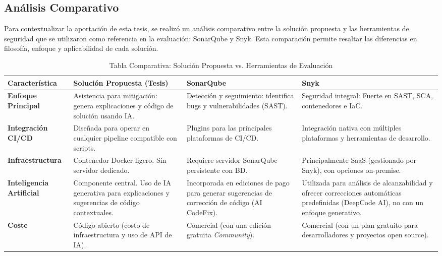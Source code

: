 \subsection{Análisis Comparativo}

Para contextualizar la aportación de esta tesis, se realizó un análisis comparativo entre la solución propuesta y las herramientas de seguridad que se utilizaron como referencia en la evaluación: SonarQube y Snyk. Esta comparación permite resaltar las diferencias en filosofía, enfoque y aplicabilidad de cada solución.

\begin{table}[h!]
\centering
\caption{Tabla Comparativa: Solución Propuesta vs. Herramientas de Evaluación}
\label{tab:comparativa_sistemas}
\begin{tabular}{|p{2.6cm}|p{3.9cm}|p{3.9cm}|p{3.9cm}|}
\hline
\textbf{Característica} & 
\textbf{Solución Propuesta (Tesis)} & 
\textbf{SonarQube} \cite{sonarqube_editions} & 
\textbf{Snyk} \cite{snyk_plans} \\ \hline

\textbf{Enfoque Principal} & 
Asistencia para mitigación: genera explicaciones y código de solución usando IA. & 
Detección y seguimiento: identifica bugs y vulnerabilidades (SAST). & 
Seguridad integral: Fuerte en SAST, SCA, contenedores e IaC. \\ \hline

\textbf{Integración CI/CD} & 
Diseñada para operar en cualquier pipeline compatible con scripts. & 
Plugins para las principales plataformas de CI/CD. & 
Integración nativa con múltiples plataformas y herramientas de desarrollo. \\ \hline

\textbf{Infraestructura} & 
Contenedor Docker ligero. Sin servidor dedicado. & 
Requiere servidor SonarQube persistente con BD. & 
Principalmente SaaS (gestionado por Snyk), con opciones on-premise. \\ \hline

\textbf{Inteligencia Artificial} & 
Componente central. Uso de IA generativa para explicaciones y sugerencias de código contextuales. & 
Incorporada en ediciones de pago para generar sugerencias de corrección de código (AI CodeFix). & 
Utilizada para análisis de alcanzabilidad y ofrecer correcciones automáticas predefinidas (DeepCode AI), no con un enfoque generativo. \\ \hline

\textbf{Coste} & 
Código abierto (costo de infraestructura y uso de API de IA). & 
Comercial (con una edición gratuita \textit{Community}). & 
Comercial (con un plan gratuito para desarrolladores y proyectos open source). \\ \hline

\end{tabular}
\end{table}



